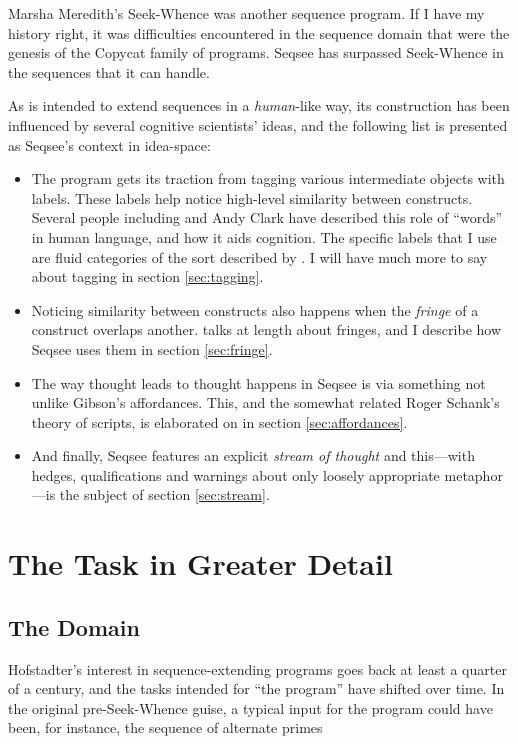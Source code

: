 \documentclass[letterpaper]{article}
\begin{document}
Marsha Meredith's Seek-Whence \cite{Meredith} was another sequence program. If I have my history right, it was difficulties encountered in the sequence domain that were the genesis of the Copycat family of programs. Seqsee has surpassed Seek-Whence in the sequences that it can handle.

As \seq is intended to extend sequences in a \emph{human}-like way, its construction has been influenced by several cognitive scientists' ideas, and the following list is presented as Seqsee's context in idea-space:

\begin{itemize}
\item The program gets its traction from tagging various intermediate objects with labels. These labels help \seq notice high-level similarity between constructs. Several people including  and Andy Clark \cite{Clark:MindWare,Clark:MagicWords} have described this role of ``words'' in human language, and how it aids cognition. The specific labels that I use are fluid categories of the sort described by \hof.
I will have much more to say about tagging in section \ref{sec:tagging}.

\item Noticing similarity between constructs also happens when the \emph{fringe} of a construct overlaps another.  talks at length about fringes, and I describe how Seqsee uses them in section \ref{sec:fringe}. 

\item The way thought leads to thought happens in Seqsee is via something not unlike Gibson's affordances.  This, and the somewhat related Roger Schank's theory of scripts, is elaborated on in section \ref{sec:affordances}.

\item And finally, Seqsee features an explicit \emph{stream of thought} \cite{James} and this---with hedges, qualifications and warnings about only loosely appropriate metaphor---is the subject of section \ref{sec:stream}.
\end{itemize}

\section{The Task in Greater Detail}
\label{sec:task}


\subsection{The Domain}
\label{sec:domain}
Hofstadter's interest in sequence-extending programs goes back at least a quarter of a century, and the tasks intended for ``the program'' have shifted over time. In the original pre-Seek-Whence guise, a typical input for the program could have been, for instance, the sequence of alternate primes 
\end{document}
